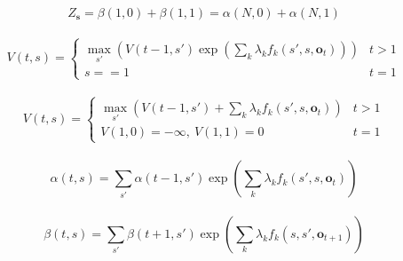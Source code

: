 \documentclass[11pt]{article}
\begin{document}
\begin{equation}
     Z_{\mathbf{s}} = \beta(1, 0) + \beta(1, 1) = \alpha(N, 0) + \alpha(N, 1)
\end{equation}
\\

\begin{equation}
V(t, s) = \left\{ \begin{array}{lc}
\max_{s'}( V(t-1, s') \exp \left( \sum_k \lambda_k f_k(s', s, \mathbf{o}_t) \right) ) & t>1 \\
s==1 & t=1
\end{array} \right.
\end{equation}
\\

\begin{equation}
V(t, s) = \left\{ \begin{array}{lc}
\max_{s'}( V(t-1, s') + \sum_k \lambda_k f_k(s', s, \mathbf{o}_t) ) & t>1 \\
V(1,0) = -\infty,\ V(1, 1) = 0 & t=1
\end{array} \right.
\end{equation}
\\

\begin{equation}
    \alpha(t, s) = \sum_{s'} \alpha(t-1, s') \exp \left( \sum_k \lambda_k f_k(s', s, \mathbf{o}_t) \right)
\end{equation}
\\

\begin{equation}
    \beta(t, s) = \sum_{s'} \beta(t+1, s') \exp \left( \sum_k \lambda_k f_k(s, s', \mathbf{o}_{t+1}) \right)
\end{equation}
\\
\end{document}
